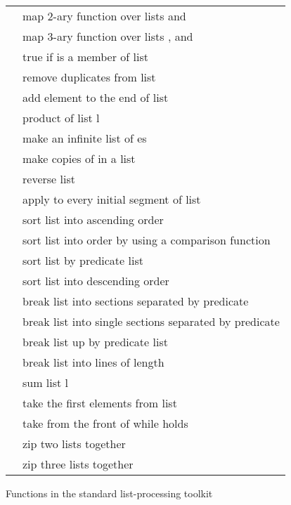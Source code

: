 \begin{tab2}
\begin{center}
\begin{tabular}{||l|l||}
\ct{map2 fn l1 l2} 	& map 2-ary function \ct{fn} over lists \ct{l1}
		 	  and \ct{l2} \\
\ct{map3 fn l1 l2 l3} 	& map 3-ary function \ct{fn} over lists \ct{l1},
		 	  \ct{l2} and \ct{l3} \\
\ct{member l x}		& true if \ct{x} is a member of list \ct{l} \\
\ct{mkset l} 		& remove duplicates from list \ct{l} \\
\ct{postfix l r} 	& add element \ct{r} to the end of list \ct{l} \\
\ct{product l} 		& product of list l \\
\ct{repeat x} 		& make an infinite list of \ct{x}es \\
\ct{replicate n x} 	& make \ct{n} copies of \ct{x} in a list \\
\ct{reverse l} 		& reverse list \ct{l} \\
\ct{scan fn st l} 	& apply \ct{(foldr fn r)} to every initial segment
			  of list \ct{l} \\
\ct{sort l} 		& sort list \ct{l} into ascending order \\
\ct{sortc fn l} 	& sort list \ct{l} into order by using a comparison
			  function \\
\ct{sortpl pl l} 	& sort list \ct{l} by predicate list \ct{pl} \\
\ct{sortr l} 		& sort list \ct{l} into descending order \\
\ct{split fn l} 	& break list \ct{l} into sections separated by
			  predicate \ct{fn} \\
\ct{splits fn l} 	& break list \ct{l} into single sections separated by
			  predicate \ct{fn} \\
\ct{splitpl pl l} 	& break list \ct{l} up by predicate list \ct{pl} \\
\ct{split\_lines n l} 	& break list \ct{l} into lines of length \ct{n} \\
\ct{sum l} 		& sum list l \\
\ct{take n l} 		& take the first \ct{n} elements from list \ct{l} \\
\ct{takewhile fn l} 	& take from the front of \ct{l} while \ct{fn} holds \\
\ct{zip2 l1 l2} 	& zip two lists together \\
\ct{zip3 l1 l2 l3} 	& zip three lists together \\
\hline
\end{tabular}
\end{center}
\caption{Functions in the standard list-processing toolkit}
\end{tab2}

